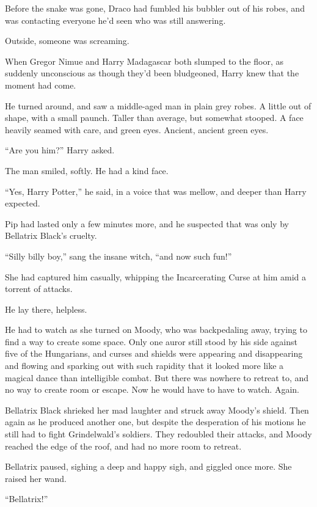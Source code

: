 Before the snake was gone, Draco had fumbled his bubbler out of his
robes, and was contacting everyone he'd seen who was still answering.

Outside, someone was screaming.

\mybreak

When Gregor Nimue and Harry Madagascar both slumped to the floor, as
suddenly unconscious as though they'd been bludgeoned, Harry knew that
the moment had come.

He turned around, and saw a middle-aged man in plain grey robes. A
little out of shape, with a small paunch. Taller than average, but
somewhat stooped. A face heavily seamed with care, and green eyes.
Ancient, ancient green eyes.

``Are you him?'' Harry asked.

The man smiled, softly. He had a kind face.

``Yes, Harry Potter,'' he said, in a voice that was mellow, and deeper
than Harry expected.

\mybreak

Pip had lasted only a few minutes more, and he suspected that was only
by Bellatrix Black's cruelty.

``Silly billy boy,'' sang the insane witch, ``and now such fun!''

She had captured him casually, whipping the Incarcerating Curse at him
amid a torrent of attacks.

He lay there, helpless.

He had to watch as she turned on Moody, who was backpedaling away,
trying to find a way to create some space. Only one auror still stood by
his side against five of the Hungarians, and curses and shields were
appearing and disappearing and flowing and sparking out with such
rapidity that it looked more like a magical dance than intelligible
combat. But there was nowhere to retreat to, and no way to create room
or escape. Now he would have to have to watch. Again.

Bellatrix Black shrieked her mad laughter and struck away Moody's
shield. Then again as he produced another one, but despite the
desperation of his motions he still had to fight Grindelwald's soldiers.
They redoubled their attacks, and Moody reached the edge of the roof,
and had no more room to retreat.

Bellatrix paused, sighing a deep and happy sigh, and giggled once more.
She raised her wand.

``Bellatrix!''

